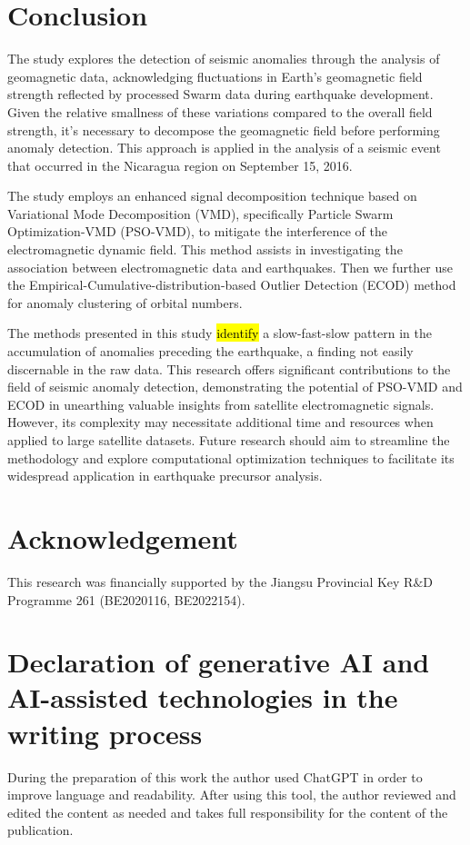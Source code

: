 \documentclass[3p,authoryear,preprint,12pt]{elsarticle}
\begin{document}
\section{Conclusion}

{The study explores the detection of seismic anomalies through the analysis of geomagnetic data, acknowledging fluctuations in Earth's geomagnetic field strength reflected by processed Swarm data during earthquake development.} Given the relative smallness of these variations compared to the overall field strength, it's necessary to decompose the geomagnetic field before performing anomaly detection. This approach is applied in the analysis of a seismic event that occurred in the Nicaragua region on September 15, 2016.

The study employs an enhanced signal decomposition technique based on Variational Mode Decomposition (VMD), specifically Particle Swarm Optimization-VMD (PSO-VMD), to mitigate the interference of the electromagnetic dynamic field. This method assists in investigating the association between electromagnetic data and earthquakes. Then we further use the Empirical-Cumulative-distribution-based Outlier Detection (ECOD) method for anomaly clustering of orbital numbers.

The methods presented in this study \hl{identify} a slow-fast-slow pattern in the accumulation of anomalies preceding the earthquake, a finding not easily discernable in the raw data. This research offers significant contributions to the field of seismic anomaly detection, demonstrating the potential of PSO-VMD and ECOD in unearthing valuable insights from satellite electromagnetic signals. {However, its complexity may necessitate additional time and resources when applied to large satellite datasets. Future research should aim to streamline the methodology and explore computational optimization techniques to facilitate its widespread application in earthquake precursor analysis.}
\section{Acknowledgement}
This research was financially supported by the Jiangsu Provincial Key R$\&$D Programme 261{ }(BE2020116, BE2022154).
    
\section{Declaration of generative AI and AI-assisted technologies in the writing process}

During the preparation of this work the author used ChatGPT in order to improve language and readability. After using this tool, the author reviewed and edited the content as needed and takes full responsibility for the content of the publication.

%

\end{document}
